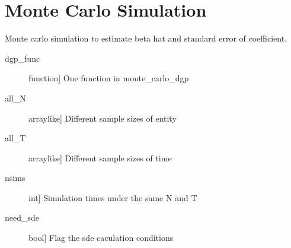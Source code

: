 \documentclass[a4paper,11pt,english]{sphinxmanual}
\begin{document}
\section{Monte Carlo Simulation}
\label{\detokenize{analysis:module-src.analysis.simulation}}\label{\detokenize{analysis:monte-carlo-simulation}}\label{\detokenize{analysis:src-analysis-simulation}}

\begin{fulllineitems}
\label{\detokenize{analysis:src.analysis.simulation.simulation_coefficient}}
\sphinxAtStartPar
Monte carlo simulation to estimate beta hat and standard error of coefficient.
\begin{description}
\item[{dgp\_func}] \leavevmode{[}function{]}
\sphinxAtStartPar
One function in monte\_carlo\_dgp

\item[{all\_N}] \leavevmode{[}array\sphinxhyphen{}like{]}
\sphinxAtStartPar
Different sample sizes of entity

\item[{all\_T}] \leavevmode{[}array\sphinxhyphen{}like{]}
\sphinxAtStartPar
Different sample sizes of time

\item[{nsims}] \leavevmode{[}int{]}
\sphinxAtStartPar
Simulation times under the same N and T

\item[{need\_sde}] \leavevmode{[}bool{]}
\sphinxAtStartPar
Flag the sde caculation conditions


\end{description}
\end{fulllineitems}
\end{document}
